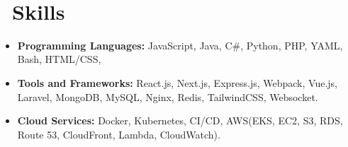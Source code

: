 \documentclass{resume}
\begin{document}


   \textperiodcentered\

  \section{\faCogs\ Skills}
  \begin{itemize}[parsep=0.5ex]
    \item \textbf{Programming Languages:} JavaScript, Java, C\#, Python, PHP, YAML, Bash, HTML/CSS,
    \item \textbf{Tools and Frameworks:} React.js, Next.js, Express.js, Webpack, Vue.js, Laravel, MongoDB, MySQL, Nginx, Redis, TailwindCSS, Websocket.
    \item \textbf{Cloud Services:} Docker, Kubernetes, CI/CD, AWS(EKS, EC2, S3, RDS, Route 53, CloudFront, Lambda, CloudWatch).
  \end{itemize}
  
  
\end{document}
